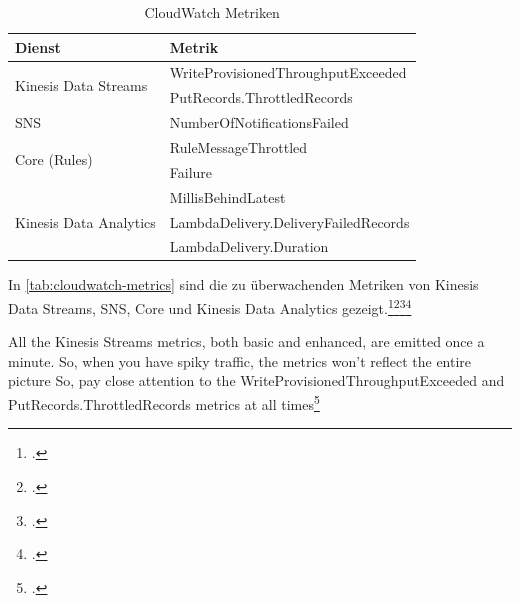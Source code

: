 \begin{table}[H]
\centering
\begin{tabular}{|l|l|}
\hline
Dienst & Metrik \\ \hline
\multirow{2}{*}{Kinesis Data Streams} & WriteProvisionedThroughputExceeded \\ \cline{2-2} 
 & PutRecords.ThrottledRecords \\ \hline
\ac{SNS} & NumberOfNotificationsFailed \\ \hline
\multirow{2}{*}{\AWSIOT{} Core (Rules)} & RuleMessageThrottled \\ \cline{2-2} 
 & Failure \\ \hline
\multirow{3}{*}{Kinesis Data Analytics} & MillisBehindLatest \\ \cline{2-2} 
 & LambdaDelivery.DeliveryFailedRecords \\ \cline{2-2} 
 & LambdaDelivery.Duration \\ \hline
\end{tabular}
\caption{CloudWatch Metriken}
\label{tab:cloudwatch-metrics}
\end{table}
In \autoref{tab:cloudwatch-metrics} sind die zu überwachenden Metriken von Kinesis Data Streams, \ac{SNS}, \AWSIOT{} Core und Kinesis Data Analytics gezeigt.\footcite[Vgl.][]{AmazonWebServicesInc..o.J.bb}\nzitat\footcite[Vgl.][]{AmazonWebServicesInc..o.J.bc}\nzitat\footcite[Vgl.][]{AmazonWebServicesInc..o.J.az}\nzitat\footcite[Vgl.][]{AmazonWebServicesInc..o.J.ay}

All the Kinesis Streams metrics, both basic and enhanced, are emitted once a minute. So, when you have spiky traffic, the metrics won’t reflect the entire picture So, pay close attention to the WriteProvisionedThroughputExceeded and PutRecords.ThrottledRecords metrics at all times\footcite[Vgl.][]{Pogosova.28.05.2020}



